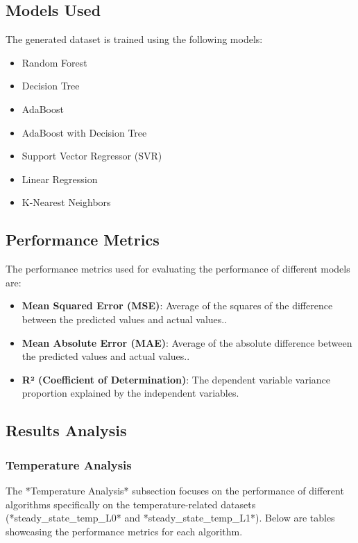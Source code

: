 \documentclass[conference]{IEEEtran}
\begin{document}
	\subsection{Models Used}
	The generated dataset is trained using the following models:
	\begin{itemize}
		\item Random Forest
		\item Decision Tree
		\item AdaBoost
		\item AdaBoost with Decision Tree
		\item Support Vector Regressor (SVR)
		\item Linear Regression
		\item K-Nearest Neighbors
	\end{itemize}
	

	\subsection{Performance Metrics}
	The performance metrics used for evaluating the performance of different models are:
	
	\begin{itemize}
		\item \textbf{Mean Squared Error (MSE)}: Average of the squares of the difference between the predicted values and actual values..
		\item \textbf{Mean Absolute Error (MAE)}: Average of the absolute difference between the predicted values and actual values..
		\item \textbf{R² (Coefficient of Determination)}: The dependent variable variance proportion explained by the independent variables.
	\end{itemize}


\subsection{Results Analysis}


\subsubsection{Temperature Analysis}

The *Temperature Analysis* subsection focuses on the performance of different algorithms specifically on the temperature-related datasets (*steady\_state\_temp\_L0* and *steady\_state\_temp\_L1*). Below are tables showcasing the performance metrics for each algorithm.
\end{document}
